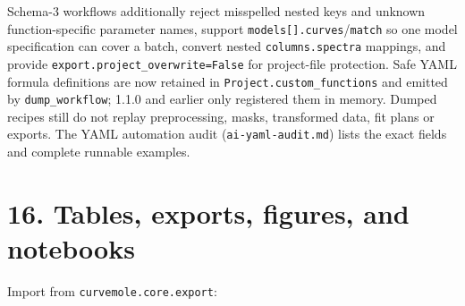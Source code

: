 \documentclass[
  10pt,
  a4paper,
  oneside]{scrreprt}
\begin{document}
Schema-3 workflows additionally reject misspelled nested keys and
unknown function-specific parameter names, support
\texttt{models{[}{]}.curves}/\texttt{match} so one model specification
can cover a batch, convert nested \texttt{columns.spectra} mappings, and
provide \texttt{export.project\_overwrite=False} for project-file
protection. Safe YAML formula definitions are now retained in
\texttt{Project.custom\_functions} and emitted by
\texttt{dump\_workflow}; 1.1.0 and earlier only registered them in
memory. Dumped recipes still do not replay preprocessing, masks,
transformed data, fit plans or exports. The YAML automation audit
(\texttt{ai-yaml-audit.md}) lists the exact fields and complete runnable
examples.

\hypertarget{tables-exports-figures-and-notebooks}{%
\section{16. Tables, exports, figures, and
notebooks}\label{tables-exports-figures-and-notebooks}}

Import from \texttt{curvemole.core.export}:
\end{document}

